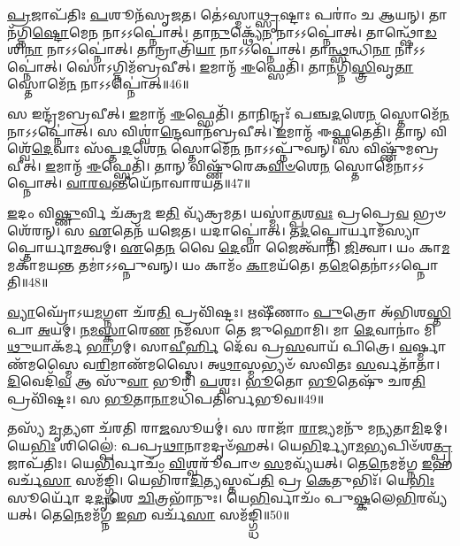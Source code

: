 \-\ul{𑌪𑍍𑌰}\-𑌜𑌾\-𑌪᳴𑌤𑌿𑌃 \ul{𑌪}\-𑌶𑍂𑌨᳴\-𑌸𑍃𑌜𑌤।
𑌤𑍇॑𑌽𑌸𑍍𑌮𑌾\-\ul{𑌥𑍍𑌸𑍃}\-𑌷𑍍𑌟𑌾𑌃 𑌪𑌰𑌾𑌂॑ 𑌚 𑌆𑌯𑌨𑍍।
𑌤𑌾𑌨᳴𑌗𑍍𑌨𑌿\-\ul{𑌷𑍍𑌟𑍋}\-𑌮𑍇\-\ul{𑌨} 𑌨𑌾𑌽𑌽𑌪𑍍𑌨𑍋॑𑌤𑍍।
𑌤𑌾\-\ul{𑌨𑍁}\-𑌕𑍍𑌥𑍍𑌯𑍇᳴\-\ul{𑌨} 𑌨𑌾𑌽𑌽𑌪𑍍𑌨𑍋॑𑌤𑍍।
𑌤𑌾𑌨𑍍𑌥𑍍𑌷𑍋᳴\-\ul{𑌡}\-𑌶𑌿\-\ul{𑌨𑌾} 𑌨𑌾𑌽𑌽𑌪𑍍𑌨𑍋॑𑌤𑍍।
𑌤𑌾𑌨𑍍𑌰𑌾𑌤𑍍𑌰𑌿᳴\-\ul{𑌯𑌾} 𑌨𑌾𑌽𑌽𑌪𑍍𑌨𑍋॑𑌤𑍍।
𑌤𑌾\-\ul{𑌨𑍍𑌥𑍍𑌸}\-𑌨𑍍𑌧𑌿\-\ul{𑌨𑌾} 𑌨𑌾𑌽𑌽𑌪𑍍𑌨𑍋॑𑌤𑍍।
𑌸𑍋॑𑌽𑌗𑍍𑌨𑌿𑌮᳴𑌬𑍍𑌰𑌵𑍀𑌤𑍍।
\-\ul{𑌇}\-𑌮𑌾𑌨𑍍𑌮᳴ \ul{𑌈}\-𑌫𑍍𑌸𑍇𑌤𑌿᳴।
𑌤𑌾\-\ul{𑌨}\-𑌗𑍍𑌨𑌿\-\ul{𑌸𑍍𑌤𑍍𑌰𑌿}\-𑌵𑍃\-\ul{𑌤𑌾} 𑌸𑍍𑌤𑍋𑌮𑍇᳴\-\ul{𑌨} 𑌨𑌾𑌽𑌽𑌪𑍍𑌨𑍋॑𑌤𑍍॥46॥

𑌸 𑌇𑌨𑍍𑌦𑍍𑌰᳴𑌮𑌬𑍍𑌰𑌵𑍀𑌤𑍍।
\-\ul{𑌇}\-𑌮𑌾𑌨𑍍𑌮᳴ \ul{𑌈}\-𑌫𑍍𑌸𑍇𑌤𑌿᳴।
𑌤𑌾𑌨𑌿𑌨𑍍𑌦𑍍𑌰𑌃᳴ 𑌪𑌞𑍍𑌚\-\ul{𑌦}\-𑌶𑍇\-\ul{𑌨} 𑌸𑍍𑌤𑍋𑌮𑍇᳴\-\ul{𑌨} 𑌨𑌾𑌽𑌽𑌪𑍍𑌨𑍋॑𑌤𑍍।
𑌸 𑌵𑌿𑌶𑍍𑌵𑌾॑\-\ul{𑌨𑍍𑌦𑍇}\-𑌵𑌾𑌨᳴𑌬𑍍𑌰𑌵𑍀𑌤𑍍।
\-\ul{𑌇}\-𑌮𑌾𑌨𑍍𑌮᳴ 𑌈\-\ul{𑌫𑍍𑌸}\-𑌤𑍇𑌤𑌿᳴।
𑌤𑌾𑌨𑍍 𑌵𑌿𑌶𑍍𑌵𑍇᳴\-\ul{𑌦𑍇}\-𑌵𑌾𑌃 𑌸᳴𑌪𑍍𑌤\-\ul{𑌦}\-𑌶𑍇\-\ul{𑌨} 𑌸𑍍𑌤𑍋𑌮𑍇᳴\-\ul{𑌨} 𑌨𑌾𑌽𑌽𑌪𑍍𑌨𑍁᳴𑌵𑌨𑍍।
𑌸 𑌵𑌿𑌷𑍍𑌣𑍁᳴𑌮𑌬𑍍𑌰𑌵𑍀𑌤𑍍।
\-\ul{𑌇}\-𑌮𑌾𑌨𑍍𑌮᳴ \ul{𑌈}\-𑌫𑍍𑌸𑍇𑌤𑌿᳴।
𑌤𑌾𑌨𑍍 𑌵𑌿𑌷𑍍𑌣𑍁᳴𑌰𑍇𑌕\-\ul{𑌵𑌿}\-\-\ul{𑍞}\-𑌶𑍇\-\ul{𑌨} 𑌸𑍍𑌤𑍋𑌮𑍇᳴𑌨𑌾𑌽𑌽𑌪𑍍𑌨𑍋𑌤𑍍।
\-\ul{𑌵𑌾}\-\-\ul{𑌰}\-\-\ul{𑌵}\-𑌨𑍍𑌤𑍀𑌯𑍇᳴𑌨𑌾𑌵𑌾𑌰𑌯𑌤॥47॥

\-\ul{𑌇}\-𑌦𑌂 𑌵𑌿\-\ul{𑌷𑍍𑌣𑍁}\-𑌰𑍍𑌵𑌿 𑌚᳴𑌕𑍍𑌰\-\ul{𑌮} 𑌇\-\ul{𑌤𑌿} 𑌵𑍍𑌯᳴𑌕𑍍𑌰𑌮𑌤।
𑌯𑌸𑍍𑌮𑌾॑\-\ul{𑌤𑍍𑌪}\-𑌶\-\ul{𑌵𑌃} 𑌪𑍍𑌰𑌪𑍍𑌰𑍇\-\ul{𑌵} 𑌭𑍍𑌰𑍞𑌶𑍇᳴𑌰𑌨𑍍।
𑌸 \ul{𑌏}\-𑌤𑍇𑌨᳴ 𑌯𑌜𑍇𑌤।
𑌯𑌦𑌾𑌪𑍍𑌨𑍋॑𑌤𑍍।
𑌤\-\ul{𑌦}\-𑌪𑍍𑌤𑍋𑌰𑍍𑌯𑌾𑌮᳴𑌸𑍍𑌯𑌾𑌪𑍍𑌤𑍋𑌰𑍍𑌯𑌾\-\ul{𑌮}\-\-𑌤𑍍𑌵𑌮𑍍।
\-\ul{𑌏}\-𑌤𑍇\-\ul{𑌨} 𑌵𑍈 \ul{𑌦𑍇}\-𑌵𑌾 𑌜𑍈𑌤𑍍𑌵𑌾᳴𑌨𑌿 \ul{𑌜𑌿}\-𑌤𑍍𑌵𑌾।
𑌯𑌂 𑌕𑌾\-\ul{𑌮}\-𑌮𑌕𑌾᳴𑌮𑌯\-\ul{𑌨𑍍𑌤} 𑌤𑌮𑌾॑𑌽𑌽𑌪𑍍𑌨𑍁𑌵𑌨𑍍।
𑌯𑌂 𑌕𑌾𑌮𑌂᳴ \ul{𑌕𑌾}\-𑌮𑌯᳴𑌤𑍇।
𑌤\-\ul{𑌮𑍇}\-𑌤𑍇𑌨𑌾॑𑌽𑌽𑌪𑍍𑌨𑍋𑌤𑌿॥48॥\anuvakamend[𑌸𑍍𑌤𑍋𑌮𑍇᳴\-\ul{𑌨} 𑌨𑌾𑌽𑌽𑌪𑍍𑌨𑍋᳴𑌦𑌵𑌾𑌰𑌯\-\ul{𑌤} 𑌨𑌵᳴ 𑌚]

\-\ul{𑌵𑍍𑌯𑌾}\-𑌘𑍍𑌰𑍋᳴\-𑌽𑌯\-\ul{𑌮}\-𑌗𑍍𑌨𑍗 𑌚᳴𑌰\-\ul{𑌤𑌿} 𑌪𑍍𑌰𑌵𑌿᳴𑌷𑍍𑌟𑌃।
𑌋𑌷𑍀᳴𑌣𑌾𑌂 \ul{𑌪𑍁}\-𑌤𑍍𑌰𑍋 𑌅᳴𑌭𑌿𑌶\-\ul{𑌸𑍍𑌤𑌿}\-𑌪𑌾 \ul{𑌅}\-𑌯𑌮𑍍।
\-\ul{𑌨}\-\-\ul{𑌮}\-\-\ul{𑌸𑍍𑌕𑌾}\-𑌰𑍇\-\ul{𑌣} 𑌨𑌮᳴𑌸𑌾 𑌤𑍇 𑌜𑍁𑌹𑍋𑌮𑌿।
𑌮𑌾 \ul{𑌦𑍇}\-𑌵𑌾𑌨𑌾𑌂॑ 𑌮𑌿\-\ul{𑌥𑍁}\-𑌯𑌾𑌕᳴𑌰𑍍𑌮 \ul{𑌭𑌾}\-𑌗𑌮𑍍।
𑌸𑌾\-\ul{𑌵𑍀}\-\-\ul{𑌰𑍍}\-𑌹𑌿 𑌦𑍇᳴𑌵 𑌪𑍍𑌰\-\ul{𑌸}\-𑌵𑌾𑌯᳴ 𑌪𑌿𑌤𑍍𑌰𑍇।
\-\ul{𑌵}\-𑌰𑍍𑌷𑍍𑌮𑌾𑌣᳴𑌮𑌸𑍍𑌮𑍈 𑌵\-\ul{𑌰𑌿}\-𑌮𑌾𑌣᳴𑌮𑌸𑍍𑌮𑍈।
𑌅\-\ul{𑌥𑌾}\-𑌸𑍍𑌮𑌭𑍍𑌯𑍞᳴ 𑌸𑌵𑌿𑌤𑌃 \ul{𑌸}\-𑌰𑍍𑌵𑌤𑌾᳴𑌤𑌾।
\-\ul{𑌦𑌿}\-𑌵𑍇𑌦𑌿᳴\-\ul{𑌵} 𑌆 𑌸𑍁᳴\-\ul{𑌵𑌾} 𑌭𑍂𑌰𑌿᳴ \ul{𑌪}\-𑌶𑍍𑌵𑌃।
\-\ul{𑌭𑍂}\-𑌤𑍋 \ul{𑌭𑍂}\-𑌤𑍇𑌷𑍁᳴ 𑌚𑌰\-\ul{𑌤𑌿} 𑌪𑍍𑌰𑌵𑌿᳴𑌷𑍍𑌟𑌃।
𑌸 \ul{𑌭𑍂}\-𑌤𑌾\-\ul{𑌨𑌾}\-𑌮𑌧𑌿᳴𑌪𑌤𑌿𑌰𑍍𑌬𑌭𑍂𑌵॥49॥

𑌤𑌸𑍍𑌯᳴ \ul{𑌮𑍃}\-𑌤𑍍𑌯𑍗 𑌚᳴𑌰𑌤𑌿 𑌰𑌾\-\ul{𑌜}\-𑌸𑍂𑌯𑌮𑍍॑।
𑌸 𑌰𑌾𑌜𑌾᳴ \ul{𑌰𑌾}\-𑌜𑍍𑌯𑌮𑌨𑍁᳴ 𑌮𑌨𑍍𑌯𑌤𑌾\-\ul{𑌮𑌿}\-𑌦𑌮𑍍।
𑌯𑍇\-\ul{𑌭𑌿𑌃} 𑌶𑌿𑌲𑍍𑌪𑍈॑: 𑌪𑌪𑍍𑌰\-\ul{𑌥𑌾}\-𑌨𑌾𑌮𑌦𑍃𑍞᳴𑌹𑌤𑍍।
𑌯𑍇\-\ul{𑌭𑌿}\-𑌰𑍍𑌦𑍍𑌯𑌾\-\ul{𑌮}\-𑌭𑍍𑌯𑌪𑌿𑍞᳴\-𑌶\-\ul{𑌤𑍍𑌪𑍍𑌰}\-𑌜𑌾\-𑌪᳴𑌤𑌿𑌃।
𑌯𑍇\-\ul{𑌭𑌿}\-𑌰𑍍𑌵𑌾𑌚𑌂᳴ \ul{𑌵𑌿}\-𑌶𑍍𑌵𑌰𑍂᳴𑌪𑌾𑍞 \ul{𑌸}\-𑌮𑌵𑍍𑌯᳴𑌯𑌤𑍍।
𑌤𑍇\-\ul{𑌨𑍇}\-𑌮𑌮᳴𑌗𑍍𑌨 \ul{𑌇}\-𑌹 𑌵𑌰𑍍𑌚᳴\-\ul{𑌸𑌾} 𑌸𑌮᳴𑌙𑍍𑌗𑍍𑌧𑌿।
𑌯𑍇𑌭𑌿᳴𑌰𑌾\-\ul{𑌦𑌿}\-𑌤𑍍𑌯𑌸𑍍𑌤𑌪᳴\-\ul{𑌤𑌿} 𑌪𑍍𑌰 \ul{𑌕𑍇}\-𑌤𑍁𑌭𑌿𑌃᳴।
𑌯𑍇\-\ul{𑌭𑌿𑌃} 𑌸𑍂𑌰𑍍𑌯𑍋᳴ 𑌦\-\ul{𑌦𑍃}\-𑌶𑍇 \ul{𑌚𑌿}\-𑌤𑍍𑌰𑌭𑌾᳴𑌨𑍁𑌃।
𑌯𑍇\-\ul{𑌭𑌿}\-𑌰𑍍𑌵𑌾𑌚𑌂᳴ 𑌪𑍁\-\ul{𑌷𑍍𑌕}\-𑌲𑍇\-\ul{𑌭𑌿}\-𑌰𑌵𑍍𑌯᳴𑌯𑌤𑍍।
𑌤𑍇\-\ul{𑌨𑍇}\-𑌮𑌮᳴𑌗𑍍𑌨 \ul{𑌇}\-𑌹 𑌵𑌰𑍍𑌚᳴\-\ul{𑌸𑌾} 𑌸𑌮᳴𑌙𑍍𑌗𑍍𑌧𑌿॥50॥


